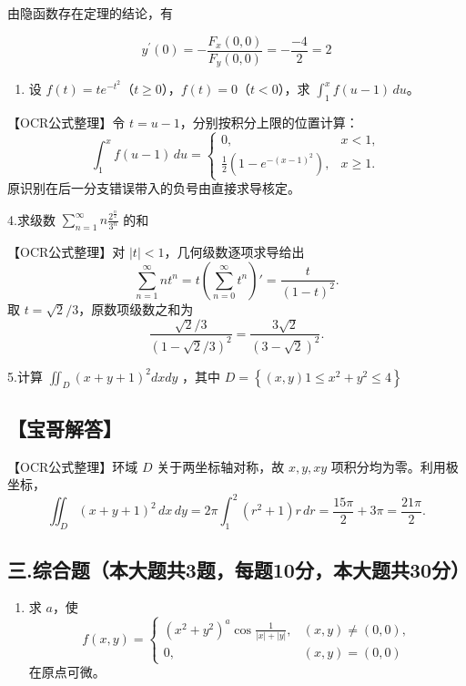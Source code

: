\documentclass[11pt,fontset=fandol]{ctexart}
\providecommand{\tightlist}{\setlength{\itemsep}{0pt}\setlength{\parskip}{0pt}}
\begin{document}
由隐函数存在定理的结论，有

\[
y ^ { \prime } ( 0 ) = - \frac { F _ { x } ( 0 , 0 ) } { F _ { y } ( 0 , 0 ) } = - \frac { - 4 } { 2 } = 2
\]

\begin{enumerate}
\def\labelenumi{\arabic{enumi}.}
\setcounter{enumi}{2}
\tightlist
\item
  设 \(f(t)=te^{-t^2}\)（\(t\ge0\)），\(f(t)=0\)（\(t<0\)），求
  \(\int_1^x f(u-1)\,du\)。
\end{enumerate}

【OCR公式整理】令 \(t=u-1\)，分别按积分上限的位置计算： \[
\int_1^x f(u-1)\,du=
\begin{cases}
0,&x<1,\\
\frac12(1-e^{-(x-1)^2}),&x\ge1.
\end{cases}
\] 原识别在后一分支错误带入的负号由直接求导核定。

4.求级数
\(\sum _ { n = 1 } ^ { \infty } n { \frac { 2 ^ { \frac { n } { 2 } } } { 3 ^ { n } } }\)
的和

【OCR公式整理】对 \(|t|<1\)，几何级数逐项求导给出 \[
\sum_{n=1}^\infty nt^n
=t\left(\sum_{n=0}^\infty t^n\right)'
=\frac{t}{(1-t)^2}.
\] 取 \(t=\sqrt2/3\)，原数项级数之和为 \[
\frac{\sqrt2/3}{(1-\sqrt2/3)^2}
=\frac{3\sqrt2}{(3-\sqrt2)^2}.
\]

5.计算 \(\iint _ { D } ( x + y + 1 ) ^ { 2 } d x d y\) ，其中
\(D = \left\{ ( x , y ) \left. 1 \leq x ^ { 2 } + y ^ { 2 } \leq 4 \right. \right\}\)

\subsection{【宝哥解答】}\label{ux5b9dux54e5ux89e3ux7b54-1}

【OCR公式整理】环域 \(D\) 关于两坐标轴对称，故 \(x,y,xy\)
项积分均为零。利用极坐标， \[
\iint_D(x+y+1)^2\,dx\,dy
=2\pi\int_1^2(r^2+1)r\,dr
=\frac{15\pi}{2}+3\pi=\frac{21\pi}{2}.
\]

\subsection{三.综合题（本大题共3题，每题10分，本大题共30分）}\label{ux4e09.ux7efcux5408ux9898ux672cux5927ux9898ux51713ux9898ux6bcfux989810ux5206ux672cux5927ux9898ux517130ux5206}

\begin{enumerate}
\def\labelenumi{\arabic{enumi}.}
\tightlist
\item
  求 \(a\)，使 \[
  f(x,y)=\begin{cases}
  (x^2+y^2)^a\cos\frac1{|x|+|y|},&(x,y)\ne(0,0),\\
  0,&(x,y)=(0,0)
  \end{cases}
  \] 在原点可微。
\end{enumerate}
\end{document}
